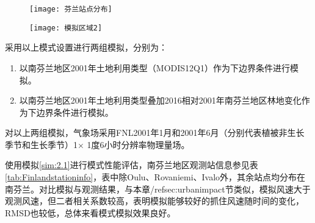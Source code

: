 \begin{figure}[!hbtp]
    \centering
    \texttt{[image: 芬兰站点分布]}
        \label{fig:Finlandstations}
\end{figure}

\begin{figure}[!hbtp]
    \centering
    \texttt{[image: 模拟区域2]}
        \label{fig:Finmodeldomain}
\end{figure}

采用以上模式设置进行两组模拟，分别为：

\begin{enumerate}

\item \label{sim:2.1} 以南芬兰地区2001年土地利用类型（MODIS12Q1）作为下边界条件进行模拟。

\item \label{sim:2.2} 以南芬兰地区2001年土地利用类型叠加2016相对2001年南芬兰地区林地变化作为下边界条件进行模拟。

\end{enumerate}

对以上两组模拟，气象场采用FNL2001年1月和2001年6月（分别代表植被非生长季节和生长季节）1$\times$ 1度6小时分辨率物理量场。

使用模拟\ref{sim:2.1}进行模式性能评估，南芬兰地区观测站信息参见表 \ref{tab:Finlandstationinfo}，表中除Oulu、Rovaniemi、Ivalo外，其余站点均分布在南芬兰。对比模拟与观测结果，与本章/ref{sec:urbanimpact}节类似，模拟风速大于观测风速，但二者相关系数较高，表明模拟能够较好的抓住风速随时间的变化，RMSD也较低，总体来看模式模拟效果良好。

